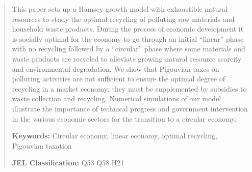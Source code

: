 \begin{abstract}
This paper sets up a Ramsey growth model with exhaustible natural resources to study the optimal recycling of polluting raw materials and household waste products. During the process of economic development it is socially optimal for the economy to go through an initial “linear” phase with no recycling followed by a “circular” phase where some materials and waste products are recycled to alleviate growing natural resource scarcity and environmental degradation. We show that Pigouvian taxes on polluting activities are not sufficient to ensure the optimal degree of recycling in a market economy; they must be supplemented by subsidies to waste collection and recycling. Numerical simulations of our model illustrate the importance of technical progress and government intervention in the various economic sectors for the transition to a circular economy.

\bigskip\noindent
\textbf{Keywords:} Circular economy, linear economy, optimal recycling, Pigouvian taxation


\bigskip\noindent
\textbf{JEL Classification:}
Q53 {\textbullet}
Q58 {\textbullet}
H21
\end{abstract}